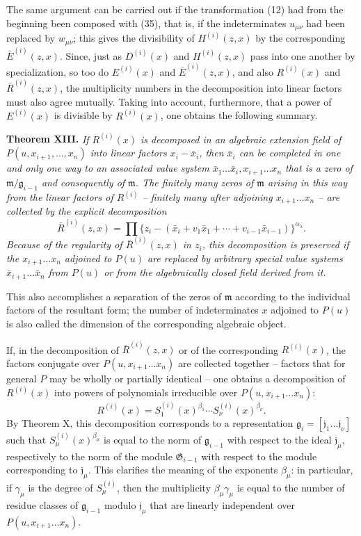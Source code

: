 \documentclass[11pt]{article}
\providecommand{\Gmod}{\mathfrak G}
\providecommand{\mideal}{\mathfrak m}
\providecommand{\gideal}{\mathfrak g}
\providecommand{\Gmod}{\mathfrak G}
\providecommand{\mideal}{\mathfrak m}
\providecommand{\gideal}{\mathfrak g}
\providecommand{\jideal}{\mathfrak j}
\begin{document}
The same argument can be carried out if the transformation (12) had from the beginning been composed with (35), that is, if the indeterminates $u_{\mu\nu}$ had been replaced by $w_{\mu\nu}$; this gives the divisibility of $H^{(i)}(z,x)$ by the corresponding $\bar E^{(i)}(z,x)$. Since, just as $D^{(i)}(x)$ and $H^{(i)}(z,x)$ pass into one another by specialization, so too do $E^{(i)}(x)$ and $\bar E^{(i)}(z,x)$, and also $R^{(i)}(x)$ and $\bar R^{(i)}(z,x)$, the multiplicity numbers in the decomposition into linear factors must also agree mutually. Taking into account, furthermore, that a power of $E^{(i)}(x)$ is divisible by $R^{(i)}(x)$, one obtains the following summary.

\medskip
\noindent\textbf{Theorem XIII.} \emph{If $R^{(i)}(x)$ is decomposed in an algebraic extension field of $P(u,x_{i+1},
\ldots,x_n)$ into linear factors $x_i-\bar x_i$, then $\bar x_i$ can be completed in one and only one way to an associated value system $\bar x_1\ldots\bar x_i,x_{i+1}\ldots x_n$ that is a zero of $\mideal/\gideal_{i-1}$ and consequently of $\mideal$. The finitely many zeros of $\mideal$ arising in this way from the linear factors of $R^{(i)}$ -- finitely many after adjoining $x_{i+1}\ldots x_n$ -- are collected by the explicit decomposition}
\begin{equation}
 \bar R^{(i)}(z,x)=\prod\{z_i-(\bar x_i+v_1\bar x_1+\cdots+v_{i-1}\bar x_{i-1})\}^{\alpha_\lambda}.
\tag{36}
\end{equation}
\emph{Because of the regularity of $\bar R^{(i)}(z,x)$ in $z_i$, this decomposition is preserved if the $x_{i+1}\ldots x_n$ adjoined to $P(u)$ are replaced by arbitrary special value systems $\bar x_{i+1}\ldots\bar x_n$ from $P(u)$ or from the algebraically closed field derived from it.}

This also accomplishes a separation of the zeros of $\mideal$ according to the individual factors of the resultant form; the number of indeterminates $x$ adjoined to $P(u)$ is also called the dimension of the corresponding algebraic object.

If, in the decomposition of $\bar R^{(i)}(z,x)$ or of the corresponding $R^{(i)}(x)$, the factors conjugate over $P(u,x_{i+1}\ldots x_n)$ are collected together -- factors that for general $P$ may be wholly or partially identical -- one obtains a decomposition of $R^{(i)}(x)$ into powers of polynomials irreducible over $P(u,x_{i+1}\ldots x_n)$:
\[
 R^{(i)}(x)=S^{(i)}_1(x)^{\beta_1}\cdots S^{(i)}_\nu(x)^{\beta_\nu}.
\]
By Theorem X, this decomposition corresponds to a representation $\gideal_i=[\jideal_1\ldots\jideal_\nu]$ such that $S^{(i)}_\mu(x)^{\beta_\mu}$ is equal to the norm of $\gideal_{i-1}$ with respect to the ideal $\jideal_\mu$, respectively to the norm of the module $\Gmod_{i-1}$ with respect to the module corresponding to $\jideal_\mu$. This clarifies the meaning of the exponents $\beta_\mu$: in particular, if $\gamma_\mu$ is the degree of $S^{(i)}_\mu$, then the multiplicity $\beta_\mu\gamma_\mu$ is equal to the number of residue classes of $\gideal_{i-1}$ modulo $\jideal_\mu$ that are linearly independent over $P(u,x_{i+1}\ldots x_n)$.
\end{document}
